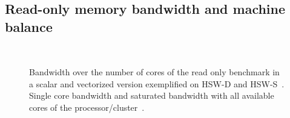 \subsection{Read-only memory bandwidth and machine balance}
\label{sec:tb:membw}

\begin{figure}[!t]%
  \centering%
  \captionsetup[subfigure]{farskip=0pt}%
   \, \hspace{0.5cm}
  \caption{Bandwidth over the number of cores of the read only benchmark in a
scalar and vectorized version exemplified on HSW-D and
HSW-S~\protect{}.
Single core bandwidth and saturated bandwidth with all available cores of the
processor/cluster~\protect{}.}
  \label{fig:mrm:bw}
\end{figure}


